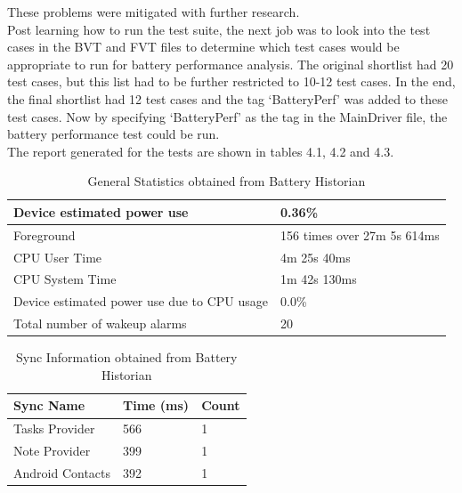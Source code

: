 These problems were mitigated with further research. \\

Post learning how to run the test suite, the next job was to look into the test cases in the BVT and FVT files to determine which test cases would be appropriate to run for battery performance analysis. The original shortlist had 20 test cases, but this list had to be further restricted to 10-12 test cases. In the end, the final shortlist had 12 test cases and the tag `BatteryPerf' was added to these test cases. Now by specifying `BatteryPerf' as the tag in the MainDriver file, the battery performance test could be run.\\

The report generated for the tests are shown in tables 4.1, 4.2 and 4.3.

\begin{table}[!h]
\begin{center}
\caption{General Statistics obtained from Battery Historian}
\label{my-label}
\begin{tabular}{|P{8cm}|P{6.5cm}|}
\hline
Device estimated power use                  & 0.36\%                      \\ \hline
Foreground                                  & 156 times over 27m 5s 614ms \\ \hline
CPU User Time                               & 4m 25s 40ms                 \\ \hline
CPU System Time                             & 1m 42s 130ms                \\ \hline
Device estimated power use due to CPU usage & 0.0\%                       \\ \hline
Total number of wakeup alarms               & 20     \\    \hline                
\end{tabular}
\end{center}
\end{table}

\begin{table}[!h]
\begin{center}
\caption{Sync Information obtained from Battery Historian}
\label{my-label}
\begin{tabular}{|P{4cm}|P{4cm}|P{4cm}|}
\hline
Sync Name        & Time (ms) & Count \\ \hline
Tasks Provider   & 566       & 1     \\ \hline
Note Provider    & 399       & 1     \\ \hline
Android Contacts & 392       & 1    \\ \hline
\end{tabular}
\end{center}
\end{table}
\pagebreak

